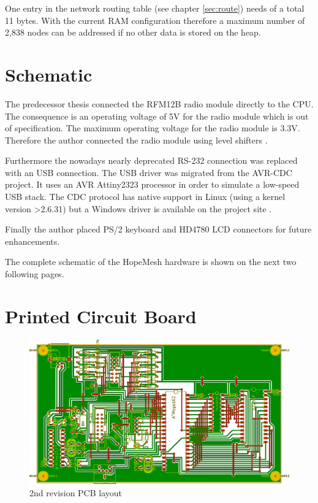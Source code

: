 One entry in the network routing table (see chapter \ref{sec:route}) needs of a total 11 bytes. With the current RAM configuration therefore a maximum number of 2,838 nodes can be addressed if no other data is stored on the heap.

\section{Schematic}%
The predecessor thesis \cite{korniowski} connected the RFM12B radio module directly to the CPU. The consequence is an operating voltage of 5V for the radio module which is out of specification. The maximum operating voltage for the radio module is 3.3V. Therefore the author connected the radio module using level shifters \cite{schutte}.

Furthermore the nowadays nearly deprecated RS-232 connection was replaced with an USB connection. The USB driver was migrated from the AVR-CDC \cite{avrcdc} project. It uses an AVR Attiny2323 processor in order to simulate a low-speed USB stack. The CDC protocol has native support in Linux (using a kernel version >2.6.31) but a Windows driver is available on the project site \cite{avrcdc}.

Finally the author placed PS/2 keyboard and HD4780 LCD connectors for future enhancements.

The complete schematic of the HopeMesh hardware is shown on the next two following pages.





\section{Printed Circuit Board}%
\begin{figure}[H]
\includegraphics[width=\textwidth]{figures/2nd_rev_pcb_layout.png}
\caption{2nd revision PCB layout}
\end{figure}

